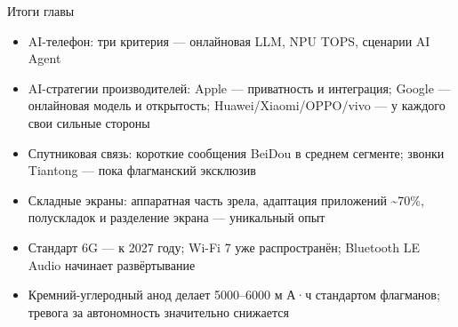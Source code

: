 \begin{tcbsummary}{Итоги главы}
\begin{itemize}
  \item AI-телефон: три критерия — онлайновая LLM, NPU TOPS, сценарии AI Agent
  \item AI-стратегии производителей: Apple — приватность и интеграция; Google — онлайновая модель и открытость; Huawei/Xiaomi/OPPO/vivo — у каждого свои сильные стороны
  \item Спутниковая связь: короткие сообщения BeiDou в среднем сегменте; звонки Tiantong — пока флагманский эксклюзив
  \item Складные экраны: аппаратная часть зрела, адаптация приложений \textasciitilde{}70\%, полускладок и разделение экрана — уникальный опыт
  \item Стандарт 6G — к 2027 году; Wi-Fi 7 уже распространён; Bluetooth LE Audio начинает развёртывание
  \item Кремний-углеродный анод делает 5000–6000 м А·ч стандартом флагманов; тревога за автономность значительно снижается
\end{itemize}

\end{tcbsummary}
